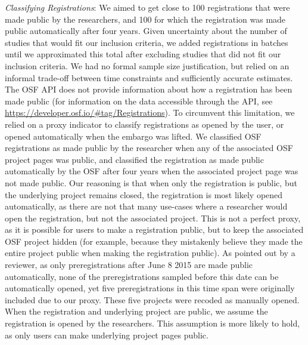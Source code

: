 \documentclass[
  ,man, a4paper,floatsintext]{apa6}
\begin{document}
\emph{Classifying Registrations}: We aimed to get close to 100 registrations that were made public by the researchers, and 100 for which the registration was made public automatically after four years. Given uncertainty about the number of studies that would fit our inclusion criteria, we added registrations in batches until we approximated this total after excluding studies that did not fit our inclusion criteria. We had no formal sample size justification, but relied on an informal trade-off between time constraints and sufficiently accurate estimates. The OSF API does not provide information about how a registration has been made public (for information on the data accessible through the API, see \url{https://developer.osf.io/\#tag/Registrations}). To circumvent this limitation, we relied on a proxy indicator to classify registrations as opened by the user, or opened automatically when the embargo was lifted. We classified OSF registrations as made public by the researcher when any of the associated OSF project pages was public, and classified the registration as made public automatically by the OSF after four years when the associated project page was not made public. Our reasoning is that when only the registration is public, but the underlying project remains closed, the registration is most likely opened automatically, as there are not that many use-cases where a researcher would open the registration, but not the associated project. This is not a perfect proxy, as it is possible for users to make a registration public, but to keep the associated OSF project hidden (for example, because they mistakenly believe they made the entire project public when making the registration public). As pointed out by a reviewer, as only preregistrations after June 8 2015 are made public automatically, none of the preregistrations sampled before this date can be automatically opened, yet five preregistrations in this time span were originally included due to our proxy. These five projects were recoded as manually opened. When the registration and underlying project are public, we assume the registration is opened by the researchers. This assumption is more likely to hold, as only users can make underlying project pages public.
\end{document}
